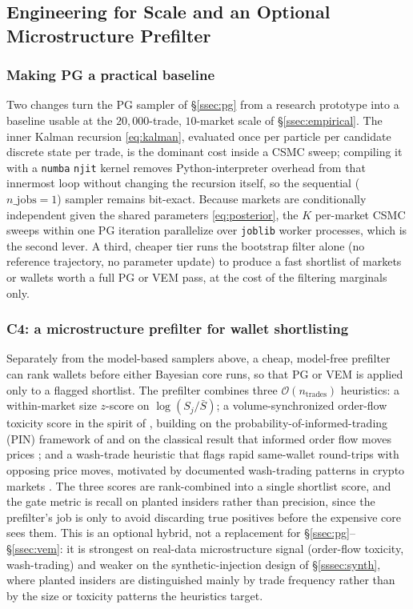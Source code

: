\subsection{Engineering for Scale and an Optional Microstructure Prefilter}\label{ssec:engineering}

\subsubsection{Making PG a practical baseline}

Two changes turn the PG sampler of \S\ref{ssec:pg} from a research prototype into a baseline usable at the $20{,}000$-trade, $10$-market scale of \S\ref{ssec:empirical}. The inner Kalman recursion \eqref{eq:kalman}, evaluated once per particle per candidate discrete state per trade, is the dominant cost inside a CSMC sweep; compiling it with a \texttt{numba} \texttt{njit} kernel removes Python-interpreter overhead from that innermost loop without changing the recursion itself, so the sequential ($n\_\mathrm{jobs}=1$) sampler remains bit-exact. Because markets are conditionally independent given the shared parameters \eqref{eq:posterior}, the $K$ per-market CSMC sweeps within one PG iteration parallelize over \texttt{joblib} worker processes, which is the second lever. A third, cheaper tier runs the bootstrap filter alone (no reference trajectory, no parameter update) to produce a fast shortlist of markets or wallets worth a full PG or VEM pass, at the cost of the filtering marginals only.

\subsubsection{C4: a microstructure prefilter for wallet shortlisting}

Separately from the model-based samplers above, a cheap, model-free prefilter can rank wallets before either Bayesian core runs, so that PG or VEM is applied only to a flagged shortlist. The prefilter combines three $\mathcal{O}(n_{\text{trades}})$ heuristics: a within-market size $z$-score on $\log(S_j/\bar S)$; a volume-synchronized order-flow toxicity score in the spirit of \citet{easley2012vpin}, building on the probability-of-informed-trading (PIN) framework of \citet{easley1996pin} and on the classical result that informed order flow moves prices \citep{kyle1985insider}; and a wash-trade heuristic that flags rapid same-wallet round-trips with opposing price moves, motivated by documented wash-trading patterns in crypto markets \citep{cong2023washtrade}. The three scores are rank-combined into a single shortlist score, and the gate metric is recall on planted insiders rather than precision, since the prefilter's job is only to avoid discarding true positives before the expensive core sees them. This is an optional hybrid, not a replacement for \S\ref{ssec:pg}--\S\ref{ssec:vem}: it is strongest on real-data microstructure signal (order-flow toxicity, wash-trading) and weaker on the synthetic-injection design of \S\ref{sssec:synth}, where planted insiders are distinguished mainly by trade frequency rather than by the size or toxicity patterns the heuristics target.

